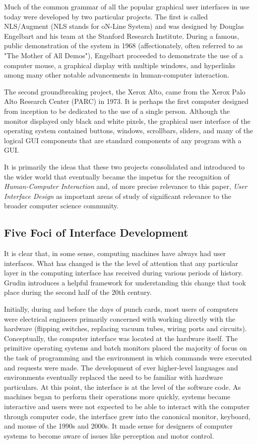 Much of the common grammar of all the popular graphical user interfaces in use today were developed by two particular projects. The first is called NLS/Augment (NLS stands for oN-Line System) and was designed by Douglas Engelbart and his team at the Stanford Research Institute. During a famous, public demonstration of the system in 1968 (affectionately, often referred to as "The Mother of All Demos"), Engelbart proceeded to demonstrate the use of a computer mouse, a graphical display with multiple windows, and hyperlinks among many other notable advancements in human-computer interaction. 

The second groundbreaking project, the Xerox Alto, came from the Xerox Palo Alto Research Center (PARC) in 1973. It is perhaps the first computer designed from inception to be dedicated to the use of a single person. Although the monitor displayed only black and white pixels, the graphical user interface of the operating system contained buttons, windows, scrollbars, sliders, and many of the logical GUI components that are standard components of any program with a GUI.

It is primarily the ideas that these two projects consolidated and introduced to the wider world that eventually became the impetus for the recognition of \emph{Human-Computer Interaction} and, of more precise relevance to this paper, \emph{User Interface Design} as important areas of study of significant relevance to the broader computer science community. 

\subsection{Five Foci of Interface Development}

It is clear that, in some sense, computing machines have always had user interfaces. What has changed is the the level of attention that any particular layer in the computing interface has received during various periods of history. Grudin \cite{continuity1990} introduces a helpful framework for understanding this change that took place during the second half of the 20th century. 

Initially, during and before the days of punch cards, most users of computers were electrical engineers primarily concerned with working directly with the hardware (flipping switches, replacing vacuum tubes, wiring ports and circuits). Conceptually, the computer interface was located at the hardware itself. The primitive operating systems and batch monitors placed the majority of focus on the task of programming and the environment in which commands were executed and requests were made. The development of ever higher-level languages and environments eventually replaced the need to be familiar with hardware particulars. At this point, the interface is at the level of the software code. As machines began to perform their operations more quickly, systems became interactive and users were not expected to be able to interact with the computer through computer code, the interface grew into the canonical monitor, keyboard, and mouse of the 1990s and 2000s. It made sense for designers of computer systems to become aware of issues like perception and motor control. 

